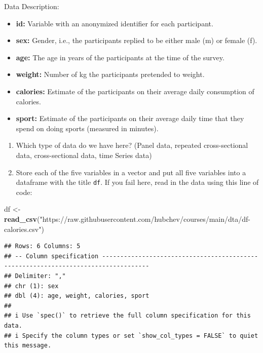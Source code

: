 \documentclass[
  12pt,
  oneside]{book}
\newenvironment{Shaded}{\begin{snugshade}}{\end{snugshade}}
\newcommand{\FunctionTok}[1]{\textcolor[rgb]{0.13,0.29,0.53}{\textbf{#1}}}
\newcommand{\NormalTok}[1]{#1}
\newcommand{\OtherTok}[1]{\textcolor[rgb]{0.56,0.35,0.01}{#1}}
\newcommand{\StringTok}[1]{\textcolor[rgb]{0.31,0.60,0.02}{#1}}
\providecommand{\tightlist}{%
  \setlength{\itemsep}{0pt}\setlength{\parskip}{0pt}}
\begin{document}
Data Description:

\begin{itemize}
\tightlist
\item
  \textbf{id:} Variable with an anonymized identifier for each participant.
\item
  \textbf{sex:} Gender, i.e., the participants replied to be either male (m) or female (f).
\item
  \textbf{age:} The age in years of the participants at the time of the survey.
\item
  \textbf{weight:} Number of kg the participants pretended to weight.
\item
  \textbf{calories:} Estimate of the participants on their average daily consumption of calories.
\item
  \textbf{sport:} Estimate of the participants on their average daily time that they spend on doing sports (measured in minutes).
\end{itemize}

\begin{enumerate}
\def\labelenumi{\alph{enumi})}
\setcounter{enumi}{4}
\tightlist
\item
  Which type of data do we have here? (Panel data, repeated cross-sectional data, cross-sectional data, time Series data)
\item
  Store each of the five variables in a vector and put all five variables into a dataframe with the title \texttt{df}. If you fail here, read in the data using this line of code:
\end{enumerate}

\begin{Shaded}
\begin{Highlighting}[]
\NormalTok{df }\OtherTok{\textless{}{-}} \FunctionTok{read\_csv}\NormalTok{(}\StringTok{"https://raw.githubusercontent.com/hubchev/courses/main/dta/df{-}calories.csv"}\NormalTok{)}
\end{Highlighting}
\end{Shaded}

\begin{verbatim}
## Rows: 6 Columns: 5
## -- Column specification -----------------------------------------------------------------------------------
## Delimiter: ","
## chr (1): sex
## dbl (4): age, weight, calories, sport
## 
## i Use `spec()` to retrieve the full column specification for this data.
## i Specify the column types or set `show_col_types = FALSE` to quiet this message.
\end{verbatim}
\end{document}
